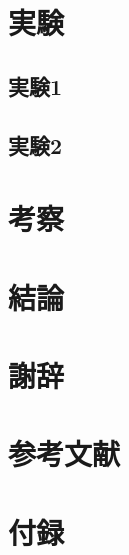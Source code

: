 \documentclass[a4paper]{jarticle}
\begin{document}
\section{実験}
\subsection{実験1}
\subsection{実験2}

\section{考察}

\section{結論}

\section*{謝辞}

\section*{参考文献}

\section*{付録}
\end{document}
